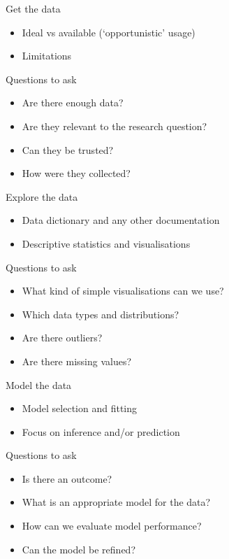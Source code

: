 \begin{frame}[t]{Get the data}
    \begin{itemize}
        \item \alert{Ideal vs available} (`opportunistic' usage)
        \item Limitations
    \end{itemize}
    \vfill
    \begin{block}{Questions to ask}
        \begin{itemize}
            \item Are there enough data?
            \item Are they relevant to the research question?
            \item Can they be trusted?
            \item How were they collected?
        \end{itemize}
    \end{block}
\end{frame}

\begin{frame}[t]{Explore the data}
    \begin{itemize}
        \item Data dictionary and any other documentation
        \item \alert{Descriptive statistics} and \alert{visualisations}
    \end{itemize}
    \vfill
    \begin{block}{Questions to ask}
        \begin{itemize}
            \item What kind of simple visualisations can we use?
            \item Which data types and distributions?
            \item Are there outliers?
            \item Are there missing values?
        \end{itemize}
    \end{block}
\end{frame}

\begin{frame}[t]{Model the data}\vspace{-1ex}
    \begin{itemize}
        \item \alert{Model selection} and fitting
        \item Focus on inference and/or prediction
    \end{itemize}
    \vfill
    \begin{block}{Questions to ask}
        \begin{itemize}
            \item Is there an outcome?
            \item What is an appropriate model for the data?
            \item How can we evaluate model performance?
            \item Can the model be refined?
        \end{itemize}
    \end{block}
\end{frame}

